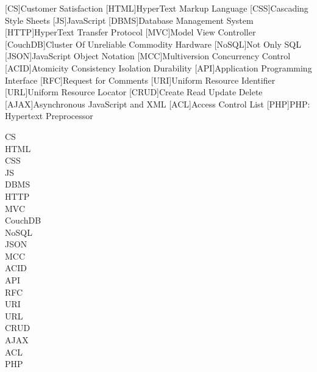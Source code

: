 [CS]{Customer Satisfaction}
[HTML]{HyperText Markup Language}
[CSS]{Cascading Style Sheets}
[JS]{JavaScript}
[DBMS]{Database Management System}
[HTTP]{HyperText Transfer Protocol}
[MVC]{Model View Controller}
[CouchDB]{Cluster Of Unreliable Commodity Hardware}
[NoSQL]{Not Only SQL}
[JSON]{JavaScript Object Notation}
[MCC]{Multiversion Concurrency Control}
[ACID]{Atomicity Consistency Isolation Durability}
[API]{Application Programming Interface}
[RFC]{Request for Comments}
[URI]{Uniform Resource Identifier}
[URL]{Uniform Resource Locator}
[CRUD]{Create Read Update Delete}
[AJAX]{Asynchronous JavaScript and XML}
[ACL]{Access Control List}
[PHP]{PHP: Hypertext Preprocessor}


\acf{CS}\\
\acf{HTML}\\
\acf{CSS}\\
\acf{JS}\\
\acf{DBMS}\\
\acf{HTTP}\\
\acf{MVC}\\
\acf{CouchDB}\\
\acf{NoSQL}\\
\acf{JSON}\\
\acf{MCC}\\
\acf{ACID}\\
\acf{API}\\
\acf{RFC}\\
\acf{URI}\\
\acf{URL}\\
\acf{CRUD}\\
\acf{AJAX}\\
\acf{ACL}\\
\acf{PHP}\\
